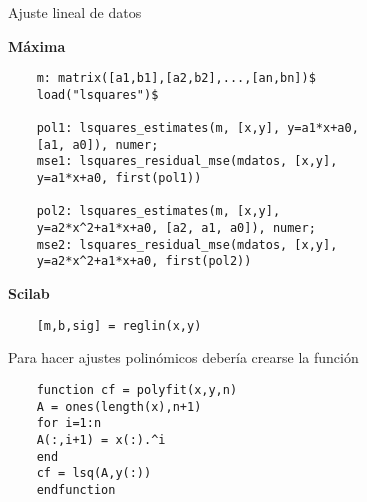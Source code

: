 \documentclass[a4paper]{article}
\begin{document}
\begin{center}
	Ajuste lineal de datos
\end{center}
\begin{multicols}{2}
	\begin{center}
		\textbf{Máxima}
	\end{center}
	\begin{verbatim}
	m: matrix([a1,b1],[a2,b2],...,[an,bn])$
	load("lsquares")$
	
	pol1: lsquares_estimates(m, [x,y], y=a1*x+a0, 
	[a1, a0]), numer;
	mse1: lsquares_residual_mse(mdatos, [x,y], 
	y=a1*x+a0, first(pol1))
	
	pol2: lsquares_estimates(m, [x,y], 
	y=a2*x^2+a1*x+a0, [a2, a1, a0]), numer;
	mse2: lsquares_residual_mse(mdatos, [x,y], 
	y=a2*x^2+a1*x+a0, first(pol2))
	\end{verbatim}
	
	\begin{center}
		\textbf{Scilab}
	\end{center}
	\begin{verbatim}
	[m,b,sig] = reglin(x,y)
	\end{verbatim}
	
	Para hacer ajustes polinómicos debería crearse la función
	\begin{verbatim}
	function cf = polyfit(x,y,n)
	A = ones(length(x),n+1)
	for i=1:n
	A(:,i+1) = x(:).^i
	end
	cf = lsq(A,y(:))
	endfunction
	\end{verbatim}
	
\end{multicols}
\end{document}

